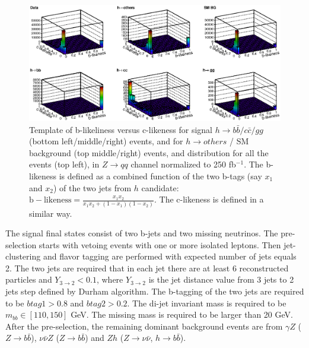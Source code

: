\begin{figure}[htb]
\begin{center}
\includegraphics[width=0.85\hsize]{chapters/figures/qqh_bbccgg_template_250.eps}
\end{center}
  \caption{Template of b-likeliness versus c-likeness for signal $h\to b\bar{b}/c\bar{c}/gg$
  (bottom left/middle/right) events,
and for $h\to others$ / SM background (top middle/right) events, and distribution for 
all the events (top left), in $Z\to qq$ channel normalized to 250 fb$^{-1}$. The b-likeness
is defined as a combined function of the two b-tags (say $x_1$ and $x_2$) 
of the two jets from $h$ candidate: $\mathrm{b-likeness} = \frac{x_1x_2}{x_1x_2+(1-x_1)(1-x_2)}$.
The c-likeness is defined in a similar way.}
  \label{fig:qqHbbccgg250}
\end{figure}

The signal final states consist of two b-jets and two missing neutrinos.
The pre-selection starts with vetoing events with one or more isolated 
leptons. Then jet-clustering and flavor tagging are performed with expected number of
jets equals 2. The two jets are required that in each jet there are at least 6
reconstructed particles and $Y_{3\to2}<0.1$, where $Y_{3\to 2}$ is the 
jet distance value from 3 jets to 2 jets step defined by Durham algorithm. The 
b-tagging of the two jets are required to be $btag1>0.8$ and $btag2>0.2$.
The di-jet invariant mass is required to be $m_{bb}\in[110,150]$ GeV.
The missing mass is required to be larger than 20 GeV.
After the pre-selection, the remaining dominant background events are
from $\gamma Z$ ($Z\to b\bar{b}$), $\nu\bar{\nu}Z$ ($Z\to b\bar{b}$) 
and $Zh$ ($Z\to\nu\bar{\nu}$, $h\to b\bar{b}$).

